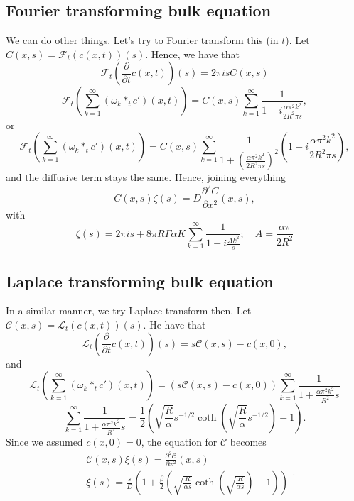 \documentclass[]{article}
\newcommand{\pderiv}[2]{\frac{\partial #1}{\partial #2}}
\begin{document}
\subsection{Fourier transforming bulk equation}
We can do other things. Let's try to Fourier transform this (in $t$). Let $C(x,s) = \mathcal{F}_t(c(x,t))(s)$. Hence, we have that
\begin{equation}
\mathcal{F}_t\left(\pderiv{}{t}c(x,t) \right)(s) = 2 \pi i s C(x,s)
\end{equation}
\begin{equation}
\mathcal{F}_t\left(\sum_{k=1}^\infty (\omega_k *_t c')(x,t)\right) = C(x,s) \sum_{k=1}^\infty \frac{1}{1 - i\frac{\alpha \pi^2 k^2}{2 R^2 \pi s}},
\end{equation}
or
\begin{equation}
\mathcal{F}_t\left(\sum_{k=1}^\infty (\omega_k *_t c')(x,t)\right) = C(x,s) \sum_{k=1}^\infty \frac{1}{1 + \left(\frac{\alpha \pi^2 k^2}{2 R^2 \pi s}\right)^2}\left(1 + i\frac{\alpha \pi^2 k^2}{2 R^2 \pi s}\right),
\end{equation}
and the diffusive term stays the same. Hence, joining everything
\begin{equation}
C(x,s) \zeta(s) = D \frac{\partial^2 C}{\partial x^2}(x,s),
\end{equation}
with
\begin{equation}
\zeta(s) = 2 \pi i s + 8 \pi R \Gamma \alpha K \sum_{k=1}^\infty \frac{1}{1 - i \frac{A k^2}{s}}; \quad A = \frac{\alpha \pi}{2 R^2}
\end{equation}

\subsection{Laplace transforming bulk equation}
In a similar manner, we try Laplace transform then. Let $\mathcal{C}(x,s) = \mathcal{L}_t(c(x,t))(s)$. 
He have that
\begin{equation}
\mathcal{L}_t\left(\pderiv{}{t}c(x,t) \right)(s) = s \mathcal{C}(x,s) - c(x,0),
\end{equation}
and
\begin{equation}
\mathcal{L}_t\left(\sum_{k=1}^\infty (\omega_k *_t c')(x,t)\right) = (s \mathcal{C}(x,s) - c(x,0)) \sum_{k=1}^\infty \frac{1}{1 + \frac{\alpha \pi^2 k^2}{R^2} s}
\end{equation}
\begin{equation}
\sum_{k=1}^\infty \frac{1}{1 + \frac{\alpha \pi^2 k^2}{R^2} s} = \frac{1}{2}\left(\sqrt{\frac{R}{\alpha}} s^{-1/2} \coth \left(\sqrt{\frac{R}{\alpha}} s^{-1/2}\right) - 1 \right).
\end{equation}
Since we assumed $c(x,0) = 0$, the equation for $\mathcal{C}$ becomes
\begin{equation}
\begin{split}
& \mathcal{C}(x,s) \xi(s) = \frac{\partial^2 \mathcal{C}}{\partial x^2}(x,s) \\
& \xi(s) = \frac{s}{D} \left(1 + \frac{\beta}{2} \left(\sqrt{\frac{R}{\alpha s}} \coth \left(\sqrt{\frac{R}{\alpha s}} \right) - 1 \right) \right)
\end{split}.
\end{equation}
\end{document}
